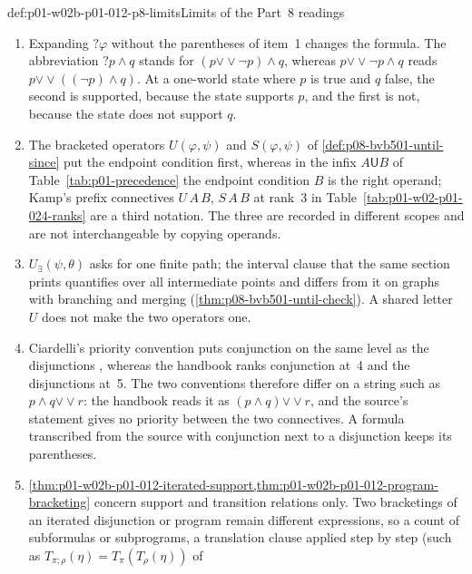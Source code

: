 \begin{hbwarning}{def:p01-w02b-p01-012-p8-limits}{Limits of the Part~8 readings}
\begin{enumerate}
\item Expanding \(?\varphi\) without the parentheses of item~1 changes the
  formula.  The abbreviation \(?p\land q\) stands for
  \((p\mathbin{\vee\!\vee}\neg p)\land q\), whereas
  \(p\mathbin{\vee\!\vee}\neg p\land q\) reads
  \(p\mathbin{\vee\!\vee}((\neg p)\land q)\).  At a one-world state where
  \(p\) is true and \(q\) false, the second is supported, because the state
  supports \(p\), and the first is not, because the state does not support
  \(q\).
\item The bracketed operators \(U(\varphi,\psi)\) and \(S(\varphi,\psi)\)
  of \cref{def:p08-bvb501-until-since} put the endpoint condition first,
  whereas in the infix \(A\mathbin{\mathsf U}B\) of
  Table~\ref{tab:p01-precedence} the endpoint condition \(B\) is the right
  operand; Kamp's prefix connectives \(U\,A\,B\), \(S\,A\,B\) at rank~3
  in Table~\ref{tab:p01-w02-p01-024-ranks} are a third notation.  The
  three are recorded in different scopes and are not interchangeable by
  copying operands.
\item \(U_{\exists}(\psi,\theta)\) asks for one finite path; the interval
  clause that the same section prints quantifies over all intermediate
  points and differs from it on graphs with branching and merging
  (\cref{thm:p08-bvb501-until-check}).  A shared letter \(U\) does not make
  the two operators one.
\item Ciardelli's priority convention puts conjunction on the same level as
  the disjunctions \cite[\S5.1, pp.~125--126]{Ciardelli2023InquisitivePropositional},
  whereas the handbook ranks conjunction at~4 and the disjunctions at~5.
  The two conventions therefore differ on a string such as
  \(p\land q\mathbin{\vee\!\vee}r\): the handbook reads it as
  \((p\land q)\mathbin{\vee\!\vee}r\), and the source's statement gives no
  priority between the two connectives.  A formula transcribed from the
  source with conjunction next to a disjunction keeps its parentheses.
\item \cref{thm:p01-w02b-p01-012-iterated-support,thm:p01-w02b-p01-012-program-bracketing}
  concern support and transition relations only.  Two bracketings of an
  iterated disjunction or program remain different expressions, so a count
  of subformulas or subprograms, a translation clause applied step by step
  (such as \(T_{\pi;\rho}(\eta)=T_\pi(T_\rho(\eta))\) of

\end{enumerate}
\end{hbwarning}
